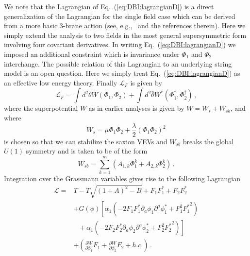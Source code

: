 \documentclass[11pt]{article}
\begin{document}
We note that the Lagrangian of Eq.~(\ref{eq:DBI:lagrangianD}) is a direct generalization of the Lagrangian for the single field case which can be derived from a more basic 3-brane action (see, e.g.,~\cite{Rocek:1997hi, Tseytlin:1999dj, Sasaki:2012ka} and the references therein).
Here we simply extend the analysis to two fields in the most general supersymmetric form involving four covariant derivatives.
In writing Eq.~(\ref{eq:DBI:lagrangianD}) we imposed an additional constraint which is invariance under $\Phi_1$ and $\Phi_2$ interchange.
The possible relation of this Lagrangian to an underlying string model is an open question.
Here we simply treat Eq.~(\ref{eq:DBI:lagrangianD}) as an effective low energy theory.
Finally $\mathcal{L}_F$ is given by
\begin{equation}
  \mathcal{L}_F = \int d^2 \theta W\left(\Phi_1, \Phi_2\right)
                + \int d^2 \bar\theta W^*\left(\Phi_1^\dagger, \Phi_2^\dagger\right)\,,
\end{equation}
where the superpotential $W$ as in earlier analyses is given by $W = W_s + W_{sb}$, and where
\begin{equation}
W_s = \mu \Phi_1 \Phi_2 + \frac{\lambda}{2} \left(\Phi_1 \Phi_2\right)^2
\end{equation}
is chosen so that we can stabilize the saxion VEVs and $W_{sb}$ breaks the global $U\left(1\right)$ symmetry and is taken to be of the form
\begin{equation} \label{eq:dbi:Wsb}
  W_{sb} = \sum_{k = 1}^m \left(A_{1, k} \Phi_1^k + A_{2, k} \Phi_2^k\right)\,.
\end{equation}
Integration over the Grassmann variables gives rise to the following Lagrangian
\begin{equation} \label{eq:dbi:lagrangianIntermediate}
  \begin{aligned}
    \mathcal{L} =
      & T - T \sqrt{\left(1 + A\right)^2 - B} + F_1 F^*_1 + F_2 F^*_2\\
      &+ G\left(\phi\right) \left[
        \alpha_1 \left(
          - 2 F_1 F^*_1 \partial_a \phi_1 \partial^a \phi^*_1
          + F_1^2 {F^*_1}^2
        \right)\right.\\
        &~~~ \left.{} + \alpha_1 \left(
          - 2 F_2 F^*_2 \partial_a \phi_2 \partial^a \phi^*_2
          + F_2^2 {F^*_2}^2
        \right)\right]\\
      &+ \left(
          \frac{\partial W}{\partial \phi_1} F_1
        + \frac{\partial W}{\partial \phi_2} F_2
        + h.c.
      \right)\,.
  \end{aligned}
\end{equation}
\end{document}

